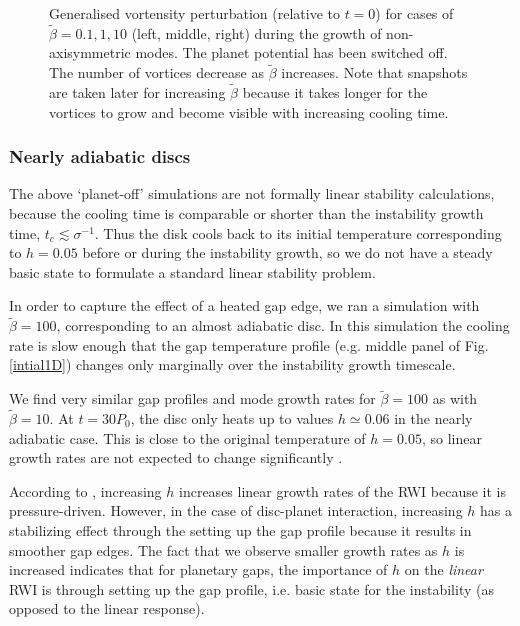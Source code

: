 \begin{figure}
{  }  
  \caption{Generalised vortensity perturbation (relative to $t=0$) for
    cases of $\tilde{\beta}=0.1,1,10$ (left, middle, right) during
    the growth of non-axisymmetric modes. The planet potential has
    been switched off.  The number of vortices
    decrease as $\tilde{\beta}$ increases. Note that snapshots are
    taken later for increasing $\tilde{\beta}$ because it takes longer
    for the vortices to grow and become visible with increasing cooling time. 
    \label{2Dlinear} 
  } 
\end{figure}

\subsubsection{Nearly adiabatic discs}
\label{adiabatic_section}

The above `planet-off' simulations are not formally linear
stability calculations, because the cooling time is comparable or shorter
than the instability growth time, $t_c\lesssim\sigma^{-1}$.  
Thus the disk cools back to its initial temperature corresponding to
$h=0.05$ before or during the instability growth, so we do not 
have a steady basic state to formulate a standard linear stability 
problem. 

In order to capture the effect of a heated gap edge, we ran a simulation with 
$\tilde{\beta}=100$, corresponding to an almost adiabatic disc.  
In this simulation the cooling rate is slow enough that the gap 
temperature profile (e.g. middle panel of Fig. \ref{intial1D}) changes
only marginally over the instability growth timescale. 

We find very similar gap profiles and mode growth rates for
$\tilde{\beta}=100$ as with $\tilde{\beta}=10$. At $t=30P_0$, the disc only heats up to
values $h\simeq0.06$ in the nearly adiabatic case. This is close to
the original temperature of $h=0.05$, so linear growth rates are not expected
to change significantly \citep{li00}. 

According to \cite{li00}, increasing $h$ increases linear growth rates
of the RWI because it is pressure-driven. However, in the case 
of disc-planet interaction, increasing $h$ has a stabilizing effect
through the setting up the gap profile because it results in smoother gap
edges. The fact that we observe smaller growth rates as $h$ is
increased indicates that for planetary gaps, the importance of $h$ on
the \emph{linear} RWI is through setting up the gap profile, i.e. basic
state for the instability (as opposed to the linear response). 

